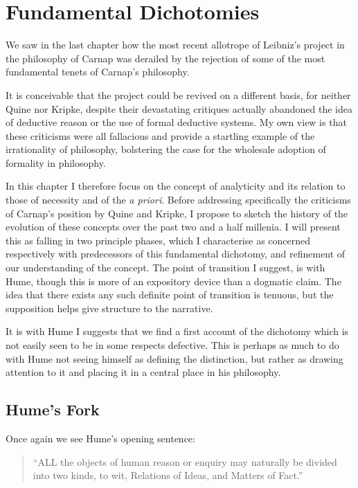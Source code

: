\def\rbjidfork{$$Id: fork.tex,v 1.5 2011/11/29 16:45:35 rbj Exp $$}

\chapter{Fundamental Dichotomies}

We saw in the last chapter how the most recent allotrope of Leibniz's project in the philosophy of Carnap was derailed by the rejection of some of the most fundamental tenets of Carnap's philosophy.

It is conceivable that the project could be revived on a different basis, for neither Quine nor Kripke, despite their devastating critiques actually abandoned the idea of deductive reason or the use of formal deductive systems.
My own view is that these criticisms were all fallacious and provide a startling example of the irrationality of philosophy, bolstering the case for the wholesale adoption of formality in philosophy.

In this chapter I therefore focus on the concept of analyticity and its relation to those of necessity and of the \emph{a priori}.
Before addressing specifically the criticisms of Carnap's position by Quine and Kripke, I propose to sketch the history of the evolution of these concepts over the past two and a half millenia.
I will present this as falling in two principle phases, which I characterise as concerned respectively with predecessors of this fundamental dichotomy, and refinement of our understanding of the concept.
The point of transition I suggest, is with Hume, though this is more of an expository device than a dogmatic claim.
The idea that there exists any such definite point of transition is tenuous, but the supposition helps give structure to the narrative.

It is with Hume I suggests that we find a first account of the dichotomy which is not easily seen to be in some respects defective.
This is perhaps as much to do with Hume not seeing himself as defining the distinction, but rather as drawing attention to it and placing it in a central place in his philosophy.

\section{Hume's Fork}\label{HumesFork}

Once again we see Hume's opening sentence\cite{humeECHU}:

\begin{quote}
``ALL the objects of human reason or enquiry may naturally be divided into two kinds, to wit, Relations of Ideas, and Matters of Fact.''
\end{quote}

